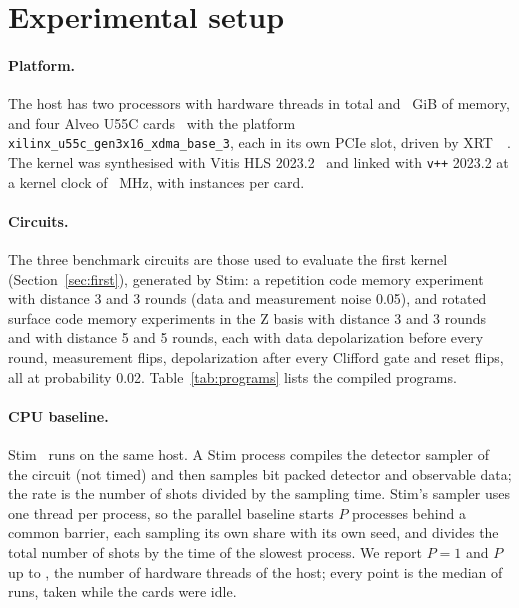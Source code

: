 \section{Experimental setup}\label{sec:setup}

\paragraph{Platform.} The host has two \NumHostCpu{} processors with \NumHostThreads{} hardware threads in total and
\NumHostMemGiB{}~GiB of memory, and four Alveo U55C cards~\cite{amd_ds978} with the platform
\texttt{xilinx\_u55c\_gen3x16\_xdma\_base\_3}, each in its own PCIe slot, driven by XRT~\NumXrtVersion{}~\cite{amd_xrt}.
The kernel was synthesised with Vitis HLS 2023.2~\cite{amd_ug1399} and linked with \texttt{v++} 2023.2 at a kernel
clock of \NumKernelMhz{}~MHz, with \NumInstancesPerCard{} instances per card.

\paragraph{Circuits.} The three benchmark circuits are those used to evaluate the first kernel
(Section~\ref{sec:first}), generated by Stim: a repetition code memory experiment with distance 3 and 3 rounds (data and measurement noise
0.05), and rotated surface code memory experiments in the Z basis with distance 3 and 3 rounds and with distance 5
and 5 rounds, each with data depolarization before every round, measurement flips, depolarization after every Clifford
gate and reset flips, all at probability 0.02. Table~\ref{tab:programs} lists the compiled programs.

\paragraph{CPU baseline.} Stim~\NumStimVersion{} runs on the same host. A Stim process compiles the detector sampler of
the circuit (not timed) and then samples bit packed detector and observable data; the rate is the number of shots
divided by the sampling time. Stim's sampler uses one thread per process, so the parallel baseline starts $P$
processes behind a common barrier, each sampling its own share with its own seed, and divides the total number of
shots by the time of the slowest process. We report $P=1$ and $P$ up to \NumCpuMaxProcs{}, the number of hardware
threads of the host; every point is the median of \NumCpuReps{} runs, taken while the cards were idle.

